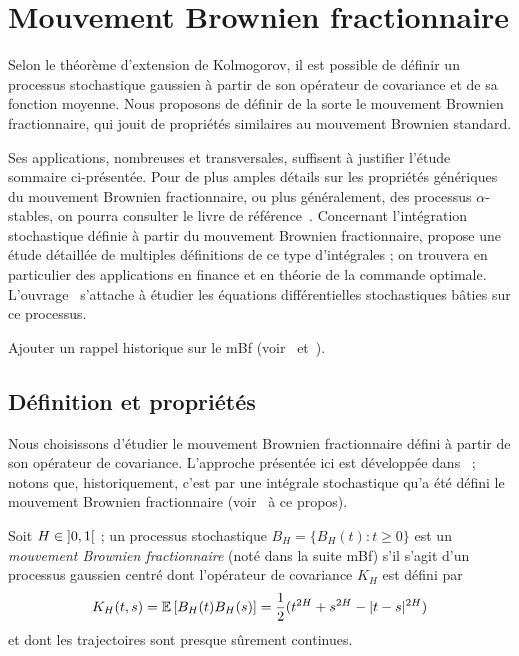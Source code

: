 \section{Mouvement Brownien fractionnaire}

Selon le théorème d'extension de Kolmogorov, il est possible de
définir un processus stochastique gaussien à partir de son opérateur
de covariance et de sa fonction moyenne. Nous proposons de définir de
la sorte le mouvement Brownien fractionnaire, qui jouit de propriétés
similaires au mouvement Brownien standard.

Ses applications, nombreuses et transversales, suffisent à justifier
l'étude sommaire ci-présentée. Pour de plus amples détails sur les
propriétés génériques du mouvement Brownien fractionnaire, ou plus
généralement, des processus $\alpha$-stables, on pourra consulter le
livre de référence~\cite{samorodnitsky1994}. Concernant l'intégration
stochastique définie à partir du mouvement Brownien fractionnaire,
\cite{biagini2008} propose une étude détaillée de multiples
définitions de ce type d'intégrales ; on trouvera en particulier des
applications en finance et en théorie de la commande
optimale. L'ouvrage~\cite{mishura2008} s'attache à étudier les
équations différentielles stochastiques bâties sur ce processus.

\begin{alert}
  Ajouter un rappel historique sur le mBf
  (voir~\cite[p.~6]{biagini2008} et~\cite{mandelbrot1968}).
\end{alert}
\subsection{Définition et propriétés}

Nous choisissons d'étudier le mouvement Brownien fractionnaire défini
à partir de son opérateur de covariance. L'approche présentée ici est
développée dans~\cite{ayache2018} ; notons que, historiquement, c'est
par une intégrale stochastique qu'a été défini le mouvement Brownien
fractionnaire (voir~\cite{mandelbrot1968} à ce propos).

\begin{definition}
  \label{def:mBf}
  Soit $H\in\left]0,1\right[$ ; un processus stochastique
  $B_H = \{B_H(t) : t\geq 0\}$ est un \emph{mouvement Brownien
    fractionnaire} (noté dans
  la suite \og mBf\fg{}) s'il s'agit d'un processus gaussien centré
  dont l'opérateur de covariance $K_H$ est défini par
  \[ K_H(t,s) = \mathbb{E}\left[B_H(t)B_H(s)\right] = \frac{1}{2}(t^{2H} + s^{2H} -
    |t-s|^{2H}) \]
  et dont les trajectoires sont presque sûrement continues.
\end{definition}

